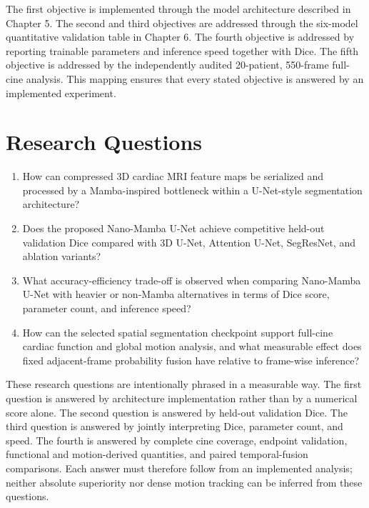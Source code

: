 The first objective is implemented through the model architecture described in Chapter 5. The second and third objectives are addressed through the six-model quantitative validation table in Chapter 6. The fourth objective is addressed by reporting trainable parameters and inference speed together with Dice. The fifth objective is addressed by the independently audited 20-patient, 550-frame full-cine analysis. This mapping ensures that every stated objective is answered by an implemented experiment.

\section{Research Questions}
\begin{enumerate}
    \item How can compressed 3D cardiac MRI feature maps be serialized and processed by a Mamba-inspired bottleneck within a U-Net-style segmentation architecture?
    \item Does the proposed Nano-Mamba U-Net achieve competitive held-out validation Dice compared with 3D U-Net, Attention U-Net, SegResNet, and ablation variants?
    \item What accuracy-efficiency trade-off is observed when comparing Nano-Mamba U-Net with heavier or non-Mamba alternatives in terms of Dice score, parameter count, and inference speed?
    \item How can the selected spatial segmentation checkpoint support full-cine cardiac function and global motion analysis, and what measurable effect does fixed adjacent-frame probability fusion have relative to frame-wise inference?
\end{enumerate}

These research questions are intentionally phrased in a measurable way. The first question is answered by architecture implementation rather than by a numerical score alone. The second question is answered by held-out validation Dice. The third question is answered by jointly interpreting Dice, parameter count, and speed. The fourth is answered by complete cine coverage, endpoint validation, functional and motion-derived quantities, and paired temporal-fusion comparisons. Each answer must therefore follow from an implemented analysis; neither absolute superiority nor dense motion tracking can be inferred from these questions.
